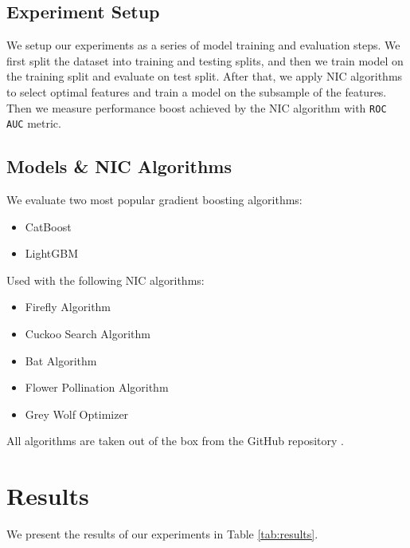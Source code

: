 \documentclass[conference]{IEEEtran}
\begin{document}
\subsection{Experiment Setup}
We setup our experiments as a series of model training and
evaluation steps. We first split the dataset into training and testing
splits, and then we train model on the training split and evaluate on
test split. After that, we apply NIC algorithms to select optimal
features and train a model on the subsample of the features. Then
we measure performance boost achieved by the NIC algorithm with
\texttt{ROC AUC} metric.

\subsection{Models \& NIC Algorithms}
We evaluate two most popular gradient boosting algorithms:
\begin{itemize}
	\item CatBoost \cite{catboost}
	\item LightGBM \cite{lightgbm}
\end{itemize}
Used with the following NIC algorithms:
\begin{itemize}
	\item Firefly Algorithm
	\item Cuckoo Search Algorithm
	\item Bat Algorithm
	\item Flower Pollination Algorithm
	\item Grey Wolf Optimizer
\end{itemize}
All algorithms are taken out of the box from the GitHub repository
\cite{niapy}.

\section{Results}
We present the results of our experiments in Table \ref{tab:results}.
\end{document}
